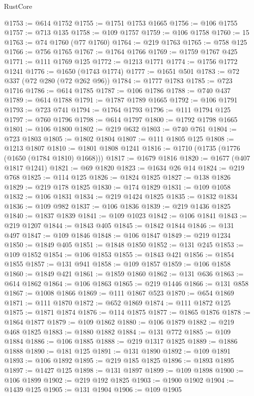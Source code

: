 \begin{lexlean}{RustCore}
\begin{coremodule}
@1753 := @614 @1752
@1755 := @1751 @1753 @1665
@1756 := @106 @1755
@1757 := @713 @135
@1758 := @109 @1757
@1759 := @106 @1758
@1760 := 15
@1763 := @74 @1760 (@77 @1760)
@1764 := @219 @1763
@1765 := @758 @125
@1766 := @756 @1765
@1767 := @1764 @1766
@1769 := @1759 @1767 @425
@1771 := @111 @1769 @125
@1772 := @1213 @1771
@1774 := @1756 @1772 @1241
@1776 := @1650 (@1743 @1774)
@1777 := @1651 @501
@1783 := @72 @337 (@72 @280 (@72 @262 @96))
@1784 := @1777 @1783
@1785 := @723 @1716
@1786 := @614 @1785
@1787 := @106 @1786
@1788 := @740 @437
@1789 := @614 @1788
@1791 := @1787 @1789 @1665
@1792 := @106 @1791
@1793 := @723 @741
@1794 := @1764 @1793
@1796 := @111 @1794 @125
@1797 := @760 @1796
@1798 := @614 @1797
@1800 := @1792 @1798 @1665
@1801 := @106 @1800
@1802 := @219 @632
@1803 := @740 @761
@1804 := @723 @1803
@1805 := @1802 @1804
@1807 := @111 @1805 @125
@1808 := @1213 @1807
@1810 := @1801 @1808 @1241
@1816 := @1710 (@1735 (@1776 (@1650 (@1784 @1810) @1668)))
@1817 := @1679 @1816
@1820 := @1677 (@407 @1817 @1241)
@1821 := @69 @1820
@1823 := @1634 @26 @14
@1824 := @219 @768
@1825 := @114 @125
@1826 := @1824 @1825
@1827 := @138 @1826
@1829 := @219 @178 @1825
@1830 := @174 @1829
@1831 := @109 @1058
@1832 := @106 @1831
@1834 := @219 @1424 @1825
@1835 := @1832 @1834
@1836 := @109 @982
@1837 := @106 @1836
@1839 := @219 @1436 @1825
@1840 := @1837 @1839
@1841 := @109 @1023
@1842 := @106 @1841
@1843 := @219 @1207
@1844 := @1843 @405
@1845 := @1842 @1844
@1846 := @131 @497
@1847 := @109 @1846
@1848 := @106 @1847
@1849 := @219 @1234
@1850 := @1849 @405
@1851 := @1848 @1850
@1852 := @131 @245
@1853 := @109 @1852
@1854 := @106 @1853
@1855 := @1843 @421
@1856 := @1854 @1855
@1857 := @131 @941
@1858 := @109 @1857
@1859 := @106 @1858
@1860 := @1849 @421
@1861 := @1859 @1860
@1862 := @131 @636
@1863 := @614 @1862
@1864 := @106 @1863
@1865 := @219 @1446
@1866 := @131 @858
@1867 := @1008 @1866
@1869 := @111 @1867 @523
@1870 := @654 @1869
@1871 := @111 @1870
@1872 := @652 @1869
@1874 := @111 @1872 @125
@1875 := @1871 @1874
@1876 := @114 @1875
@1877 := @1865 @1876
@1878 := @1864 @1877
@1879 := @109 @1862
@1880 := @106 @1879
@1882 := @219 @468 @1825
@1883 := @1880 @1882
@1884 := @131 @772
@1885 := @109 @1884
@1886 := @106 @1885
@1888 := @219 @1317 @1825
@1889 := @1886 @1888
@1890 := @181 @125
@1891 := @131 @1890
@1892 := @109 @1891
@1893 := @106 @1892
@1895 := @219 @185 @1825
@1896 := @1893 @1895
@1897 := @1427 @125
@1898 := @131 @1897
@1899 := @109 @1898
@1900 := @106 @1899
@1902 := @219 @192 @1825
@1903 := @1900 @1902
@1904 := @1439 @125
@1905 := @131 @1904
@1906 := @109 @1905

\end{coremodule}
\end{lexlean}
